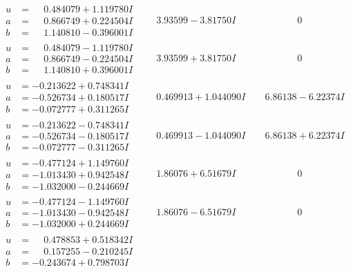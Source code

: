 \documentclass[1p]{elsarticle_modified}
\theoremstyle{definition}
\begin{document}
$$\begin{array}{c|c|c}
\begin{aligned}
u &= \phantom{-}0.484079 + 1.119780 I \\
a &= \phantom{-}0.866749 + 0.224504 I \\
b &= \phantom{-}1.140810 - 0.396001 I\end{aligned}
 & \phantom{-}3.93599 - 3.81750 I & \phantom{-0.000000 } 0 \\ \hline\begin{aligned}
u &= \phantom{-}0.484079 - 1.119780 I \\
a &= \phantom{-}0.866749 - 0.224504 I \\
b &= \phantom{-}1.140810 + 0.396001 I\end{aligned}
 & \phantom{-}3.93599 + 3.81750 I & \phantom{-0.000000 } 0 \\ \hline\begin{aligned}
u &= -0.213622 + 0.748341 I \\
a &= -0.526734 + 0.180517 I \\
b &= -0.072777 + 0.311265 I\end{aligned}
 & \phantom{-}0.469913 + 1.044090 I & \phantom{-}6.86138 - 6.22374 I \\ \hline\begin{aligned}
u &= -0.213622 - 0.748341 I \\
a &= -0.526734 - 0.180517 I \\
b &= -0.072777 - 0.311265 I\end{aligned}
 & \phantom{-}0.469913 - 1.044090 I & \phantom{-}6.86138 + 6.22374 I \\ \hline\begin{aligned}
u &= -0.477124 + 1.149760 I \\
a &= -1.013430 + 0.942548 I \\
b &= -1.032000 - 0.244669 I\end{aligned}
 & \phantom{-}1.86076 + 6.51679 I & \phantom{-0.000000 } 0 \\ \hline\begin{aligned}
u &= -0.477124 - 1.149760 I \\
a &= -1.013430 - 0.942548 I \\
b &= -1.032000 + 0.244669 I\end{aligned}
 & \phantom{-}1.86076 - 6.51679 I & \phantom{-0.000000 } 0 \\ \hline\begin{aligned}
u &= \phantom{-}0.478853 + 0.518342 I \\
a &= \phantom{-}0.157255 - 0.210245 I \\
b &= -0.243674 + 0.798703 I\end{aligned}

\end{array}$$
\end{document}
